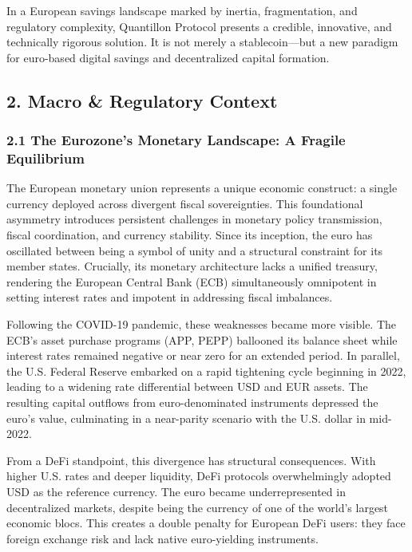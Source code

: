 In a European savings landscape marked by inertia, fragmentation, and
regulatory complexity, Quantillon Protocol presents a credible,
innovative, and technically rigorous solution. It is not merely a
stablecoin---but a new paradigm for euro-based digital savings and
decentralized capital formation.

\hypertarget{macro-regulatory-context}{%
\subsection{2. Macro \& Regulatory
Context}\label{macro-regulatory-context}}

\hypertarget{the-eurozones-monetary-landscape-a-fragile-equilibrium}{%
\subsubsection{2.1 The Eurozone's Monetary Landscape: A Fragile
Equilibrium}\label{the-eurozones-monetary-landscape-a-fragile-equilibrium}}

The European monetary union represents a unique economic construct: a
single currency deployed across divergent fiscal sovereignties. This
foundational asymmetry introduces persistent challenges in monetary
policy transmission, fiscal coordination, and currency stability. Since
its inception, the euro has oscillated between being a symbol of unity
and a structural constraint for its member states. Crucially, its
monetary architecture lacks a unified treasury, rendering the European
Central Bank (ECB) simultaneously omnipotent in setting interest rates
and impotent in addressing fiscal imbalances.

Following the COVID-19 pandemic, these weaknesses became more visible.
The ECB's asset purchase programs (APP, PEPP) ballooned its balance
sheet while interest rates remained negative or near zero for an
extended period. In parallel, the U.S. Federal Reserve embarked on a
rapid tightening cycle beginning in 2022, leading to a widening rate
differential between USD and EUR assets. The resulting capital outflows
from euro-denominated instruments depressed the euro's value,
culminating in a near-parity scenario with the U.S. dollar in mid-2022.

From a DeFi standpoint, this divergence has structural consequences.
With higher U.S. rates and deeper liquidity, DeFi protocols
overwhelmingly adopted USD as the reference currency. The euro became
underrepresented in decentralized markets, despite being the currency of
one of the world's largest economic blocs. This creates a double penalty
for European DeFi users: they face foreign exchange risk and lack native
euro-yielding instruments.

